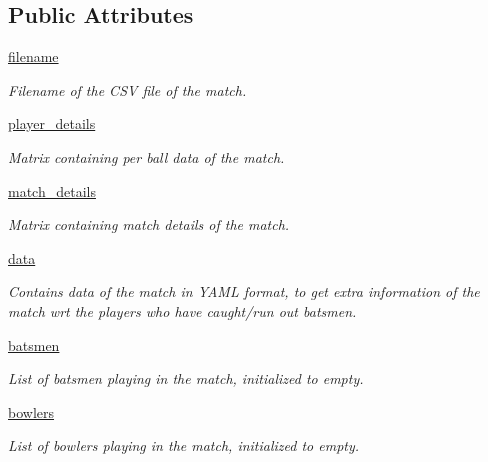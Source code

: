\subsection*{Public Attributes}
\begin{DoxyCompactItemize}
\item 
\hyperlink{classaccess_1_1Read_afc80365a54bec281993b7a257080b029}{filename}
\begin{DoxyCompactList}\small\item\em Filename of the C\+SV file of the match. \end{DoxyCompactList}\item 
\hyperlink{classaccess_1_1Read_a4682ffb3f43ec732d63d89d8ee78cc1a}{player\+\_\+details}
\begin{DoxyCompactList}\small\item\em Matrix containing per ball data of the match. \end{DoxyCompactList}\item 
\hyperlink{classaccess_1_1Read_afb6b007e7b4888e71b0aedc00e92708d}{match\+\_\+details}
\begin{DoxyCompactList}\small\item\em Matrix containing match details of the match. \end{DoxyCompactList}\item 
\hyperlink{classaccess_1_1Read_a5a7dbfc250ef34435c08e175135c7c90}{data}
\begin{DoxyCompactList}\small\item\em Contains data of the match in Y\+A\+ML format, to get extra information of the match wrt the players who have caught/run out batsmen. \end{DoxyCompactList}\item 
\mbox{\label{classaccess_1_1Read_ab6154e0bef5bd2a28c273032518a4323}} 
\hyperlink{classaccess_1_1Read_ab6154e0bef5bd2a28c273032518a4323}{batsmen}
\begin{DoxyCompactList}\small\item\em List of batsmen playing in the match, initialized to empty. \end{DoxyCompactList}\item 
\mbox{\label{classaccess_1_1Read_a55d1e15ed23c47ad8f6b54d1341b5e36}} 
\hyperlink{classaccess_1_1Read_a55d1e15ed23c47ad8f6b54d1341b5e36}{bowlers}
\begin{DoxyCompactList}\small\item\em List of bowlers playing in the match, initialized to empty. \end{DoxyCompactList}\end{DoxyCompactItemize}


